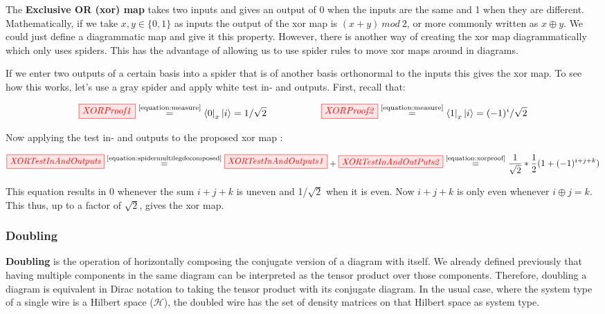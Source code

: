 \documentclass[]{article}
\newcommand{\equaltext}[1]{\ensuremath{\stackrel{\text{#1}}{=}}}
\begin{document}
\label{xorgate}

The \textbf{Exclusive OR (xor) map} takes two inputs and gives an output of 0 when the inputs are the same and 1 when they are different. Mathematically, if we take $x, y \in \{0,1\} $ as inputs the output of the xor map is $(x + y)~mod~2$, or more commonly written as $x \oplus y$. We could just define a diagrammatic map and give it this property. However, there is another way of creating the xor map diagrammatically which only uses spiders. This has the advantage of allowing us to use spider rules to move xor maps around in diagrams.

If we enter two outputs of a certain basis into a spider that is of another basis orthonormal to the inputs this gives the xor map. To see how this works, let's use a gray spider and apply white test in- and outputs. First, recall that:

\begin{equation}
\label{equation:xorproof}
\tikzfig{XORProof1} \equaltext{\ref{equation:measure}} \bra{0}_x\ket{i} =  1/\sqrt{2} ~~~~~~~~~~~~~~~~~ \tikzfig{XORProof2} \equaltext{\ref{equation:measure}} \bra{1}_x\ket{i} = (-1)^i/\sqrt{2}
\end{equation}

Now applying the test in- and outputs to the proposed xor map \cite{Coecke2017}:

\begin{equation}
\label{equation:xormap}
\tikzfig{XORTestInAndOutputs} \equaltext{\ref{equation:spidermultilegdecomposed}} \tikzfig{XORTestInAndOutputs1} + \tikzfig{XORTestInAndOutPuts2} \equaltext{\ref{equation:xorproof}} \frac{1}{\sqrt{2}} * \frac{1}{2}(1+(-1)^{i+j+k})
\end{equation}

This equation results in 0 whenever the sum $i+j+k$ is uneven and 1/$\sqrt{2}$ when it is even. Now $i+j+k$ is only even whenever $i \oplus j = k$. This thus, up to a factor of $\sqrt{2}$, gives the xor map.


\subsubsection{Doubling}
\label{doubling}

\textbf{Doubling} is the operation of horizontally composing the conjugate version of a diagram with itself. We already defined previously that having multiple components in the same diagram can be interpreted as the tensor product over those components. Therefore, doubling a diagram is equivalent in Dirac notation to taking the tensor product with its conjugate diagram. In the usual case, where the system type of a single wire is a Hilbert space ($\mathcal{H}$), the doubled wire has the set of density matrices on that Hilbert space as system type.
\end{document}
